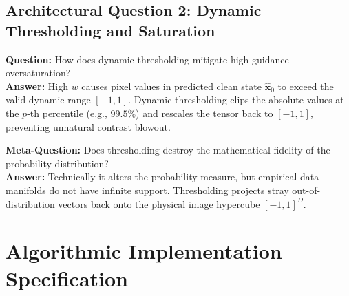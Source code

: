\documentclass[11pt,a4paper]{article}
\theoremstyle{definition}
\begin{document}
\subsection{Architectural Question 2: Dynamic Thresholding and Saturation}
\textbf{Question:} How does dynamic thresholding mitigate high-guidance oversaturation?\\
\textbf{Answer:} High $w$ causes pixel values in predicted clean state $\hat{\mathbf{x}}_0$ to exceed the valid dynamic range $[-1, 1]$. Dynamic thresholding clips the absolute values at the $p$-th percentile (e.g., $99.5\%$) and rescales the tensor back to $[-1, 1]$, preventing unnatural contrast blowout.

\textbf{Meta-Question:} Does thresholding destroy the mathematical fidelity of the probability distribution?\\
\textbf{Answer:} Technically it alters the probability measure, but empirical data manifolds do not have infinite support. Thresholding projects stray out-of-distribution vectors back onto the physical image hypercube $[-1, 1]^D$.

\section{Algorithmic Implementation Specification}
\end{document}
